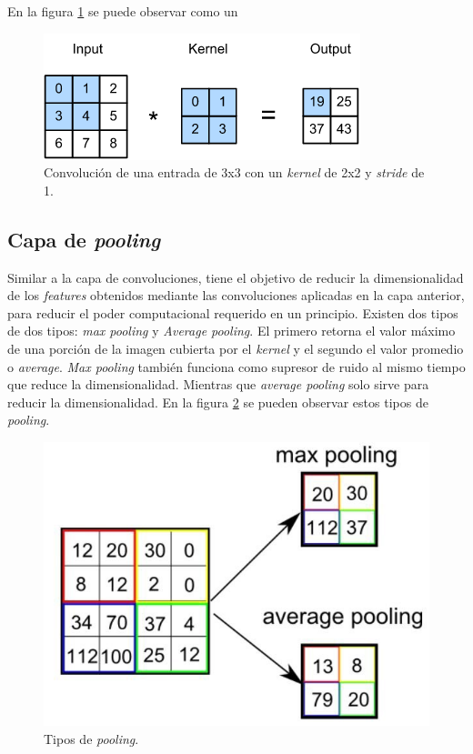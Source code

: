 En la figura \ref{fig:cnn_conv} se puede observar como un

\begin{figure}[h]
	\centering
	\includegraphics[scale=0.7]{./Figures/cnn_conv.png}
	\caption{Convolución de una entrada de 3x3 con un \textit{kernel} de 2x2 y \textit{stride} de 1.}
	\label{fig:cnn_conv}
\end{figure}

\subsection{Capa de \textit{pooling}}
Similar a la capa de convoluciones, tiene el objetivo de reducir la dimensionalidad de los \textit{features} obtenidos mediante las convoluciones aplicadas en la capa anterior, para reducir el poder computacional requerido en un principio. Existen dos tipos de dos tipos: \textit{max pooling} y \textit{Average pooling}. El primero retorna el valor máximo de una porción de la imagen cubierta por el \textit{kernel} y el segundo el valor promedio o \textit{average}. \textit{Max pooling} también funciona como supresor de ruido al mismo tiempo que reduce la dimensionalidad. Mientras que \textit{average pooling} solo sirve para reducir la dimensionalidad. En la figura \ref{fig:cnn_pool} se pueden observar estos tipos de \textit{pooling}.

\begin{figure}[h]
	\centering
	\includegraphics[scale=0.3]{./Figures/cnn_pool.png}
	\caption{Tipos de \textit{pooling}.}
	\label{fig:cnn_pool}
\end{figure}

